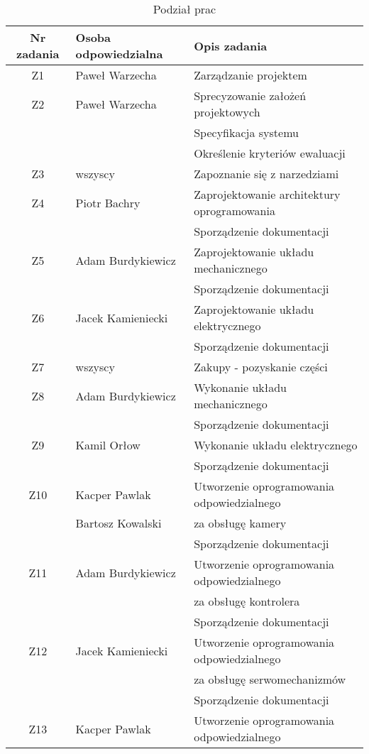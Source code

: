 \documentclass[a4paper, 11pt]{article}
\begin{document}
\begin{table}[h]
\caption{Podział prac}
\label{Plan}

\begin{tabular}{|c|l|l|} \hline
Nr zadania & Osoba odpowiedzialna & Opis zadania \\ \hline
Z1 & Paweł Warzecha & Zarządzanie projektem \\ \hline
Z2 & Paweł Warzecha & Sprecyzowanie założeń projektowych \\
 & & Specyfikacja systemu \\
 & & Określenie kryteriów ewaluacji \\ \hline
Z3 & wszyscy & Zapoznanie się z narzedziami \\ \hline \hline
Z4 & Piotr Bachry & Zaprojektowanie architektury oprogramowania \\
 & & Sporządzenie dokumentacji \\ \hline
Z5 & Adam Burdykiewicz & Zaprojektowanie układu mechanicznego \\
 & & Sporządzenie dokumentacji \\ \hline
Z6 & Jacek Kamieniecki & Zaprojektowanie układu elektrycznego \\ 
 & & Sporządzenie dokumentacji \\ \hline \hline
Z7 & wszyscy & Zakupy - pozyskanie części \\ \hline
Z8 & Adam Burdykiewicz & Wykonanie układu mechanicznego \\
 & & Sporządzenie dokumentacji \\ \hline
Z9 & Kamil Orłow & Wykonanie układu elektrycznego \\
 & & Sporządzenie dokumentacji \\ \hline \hline
Z10 & Kacper Pawlak  & Utworzenie oprogramowania odpowiedzialnego \\
 & Bartosz Kowalski & za obsługę kamery \\
 & & Sporządzenie dokumentacji \\ \hline 
Z11 & Adam Burdykiewicz & Utworzenie oprogramowania odpowiedzialnego \\
 & & za obsługę kontrolera \\
 & & Sporządzenie dokumentacji \\ \hline
Z12 & Jacek Kamieniecki & Utworzenie oprogramowania odpowiedzialnego \\
 & & za obsługę serwomechanizmów \\
 & & Sporządzenie dokumentacji \\ \hline
Z13 & Kacper Pawlak  & Utworzenie oprogramowania odpowiedzialnego \\ 

\end{tabular}
\end{table}
\end{document}
